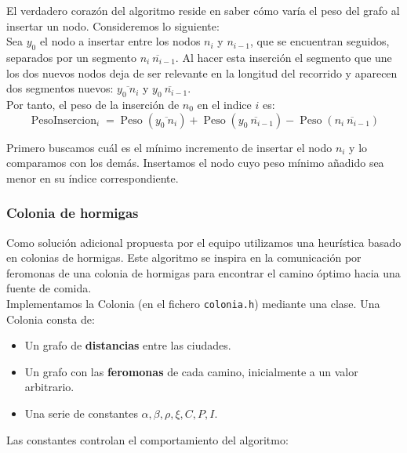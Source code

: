 \newpage

\vspace*{1cm}

El verdadero corazón del algoritmo reside en saber cómo varía el peso del grafo al insertar un nodo.
Consideremos lo siguiente: \\

Sea $y_0$ el nodo a insertar entre los nodos $n_i$ y $n_{i-1}$, que se encuentran seguidos, separados por un segmento $\overline{n_i \ n_{i-1}}$. Al hacer esta inserción el segmento que une los dos nuevos nodos deja de ser relevante en la longitud del recorrido y aparecen dos segmentos nuevos: $\overline{y_0 \ n_i}$ y $\overline{y_0 \ n_{i-1}}$.\\

Por tanto, el peso de la inserción de $n_0$ en el indice $i$ es:
$$ \operatorname{PesoInsercion}_i = \operatorname{Peso}(\overline{y_0 \ n_i})+\operatorname{Peso}(\overline{y_0 \ n_{i-1}})-\operatorname{Peso}(\overline{n_i \ n_{i-1}})$$

Primero buscamos cuál es el mínimo incremento de insertar el nodo $n_i$ y lo comparamos con los demás. Insertamos el nodo cuyo peso mínimo añadido sea menor en su índice correspondiente.

\newpage

\subsubsection{Colonia de hormigas}

Como solución adicional propuesta por el equipo utilizamos una heurística basado en
colonias de hormigas. Este algoritmo se inspira en la comunicación por feromonas
de una colonia de hormigas para encontrar el camino óptimo hacia una fuente de comida. \\

Implementamos la Colonia (en el fichero \texttt{colonia.h}) mediante una clase. Una Colonia consta de:

\begin{itemize}
  \item Un grafo de \textbf{distancias} entre las ciudades.
  \item Un grafo con las \textbf{feromonas} de cada camino, inicialmente a un valor arbitrario.
  \item Una serie de constantes $\alpha, \beta, \rho, \xi, C, P, I$.
\end{itemize}

Las constantes controlan el comportamiento del algoritmo:

